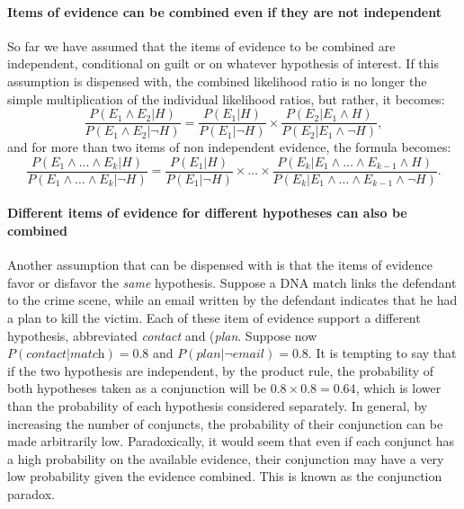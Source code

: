\documentclass[10pt]{article}
\begin{document}
\paragraph{Items of evidence can be combined 
even if they are not independent}

So far we have assumed that the items of evidence to be combined are independent, 
conditional on guilt or on whatever hypothesis of interest. 
%
%
If this assumption is dispensed with, the combined likelihood ratio is no longer the simple 
multiplication of the individual likelihood ratios, 
but rather, it becomes:
%
\[\frac{P(E_1\wedge E_2 | H)}{P(E_1\wedge E_2 | \neg H)}=\frac{P(E_1| H)}{P(E_1| \neg H)}\times \frac{P(E_2 | E_1\wedge H)}{P(E_2| E_1\wedge \neg H)},\]
%
and for more than two items of non independent evidence, the formula becomes:
%
\[\frac{P(E_1\wedge \dots \wedge E_k | H)}{P(E_1\wedge \dots \wedge E_k | \neg H)}=\frac{P(E_1| H)}{P(E_1| \neg H)} \times \dots \times \frac{P(E_k | E_1  \wedge \dots \wedge E_{k-1} \wedge H)}{P(E_k| E_1 \wedge \dots \wedge E_{k-1} \wedge \neg H)} .\]




\paragraph{Different items of evidence for different hypotheses can also be combined}

Another assumption that can be dispensed with is that the items of evidence favor or disfavor the \textit{same} hypothesis. %
Suppose a DNA match links the defendant to the crime scene, while an email written by the defendant indicates 
that he had a plan to kill the victim. Each of these item of evidence support a different hypothesis, abbreviated
 \textit{contact} and (\textit{plan}.
Suppose now $P( \textit{contact} | \textit{match})= 0.8$ and $P(\textit{plan} | \neg \textit{email})=0.8$. It is tempting 
to say that if the two hypothesis are independent, by the product rule, the probability of both hypotheses taken 
as a conjunction will be $0.8\times 0.8=0.64$, which is lower than the probability 
of each hypothesis considered separately.
%
%
In general, by increasing the number of conjuncts, 
the probability of their conjunction can be made arbitrarily low. 
Paradoxically, it would seem that even if each conjunct has 
a high probability on the available evidence, their conjunction may have 
a very low probability given the evidence combined. 
This is known as the conjunction paradox. %
\end{document}
